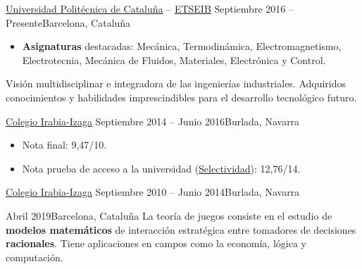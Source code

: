 \documentclass[10pt, a4paper, ragged2e]{../altacv}
\begin{document}
{\href{https://upc.edu}{Universidad Politécnica de Cataluña} --
\href{https://etseib.upc.edu}{ETSEIB}}
{Septiembre 2016 -- Presente}{Barcelona, Cataluña}
\begin{itemize}
  \item \textbf{Asignaturas} destacadas: Mecánica, Termodinámica,
  Electromagnetismo, Electrotecnia, Mecánica de Fluidos, Materiales,
  Electrónica y Control.
\end{itemize}
Visión multidisciplinar e integradora de las ingenierías industriales.
Adquiridos conocimientos y habilidades imprescindibles para el desarrollo
tecnológico futuro.

\divider

{\href{https://www.irabia-izaga.org}{Colegio Irabia-Izaga}}
{Septiembre 2014 -- Junio 2016}{Burlada, Navarra}
\begin{itemize}
  \item Nota final: 9,47/10.
  \item Nota prueba de acceso a la universidad
  (\href{https://es.wikipedia.org/wiki/Selectividad_(examen)}{Selectividad}):
  12,76/14.
\end{itemize}

\divider

{\href{https://www.irabia-izaga.org}{Colegio Irabia-Izaga}}
{Septiembre 2010 -- Junio 2014}{Burlada, Navarra}

\medskip
{}

{Abril 2019}{Barcelona, Cataluña}
La teoría de juegos consiste en el estudio de \textbf{modelos matemáticos} de
interacción estratégica entre tomadores de decisiones \textbf{racionales}. Tiene
aplicaciones en campos como la economía, lógica y computación.

\vspace{.1cm}
\divider
\vspace{.15cm}
\end{document}
